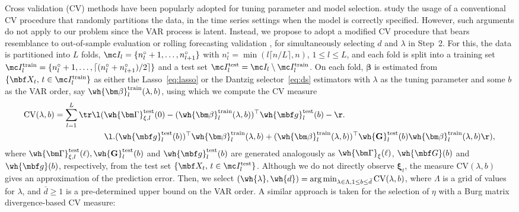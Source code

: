 Cross validation (CV) methods have been popularly adopted for tuning parameter and model selection.
\cite{bergmeir2018note} study the usage of a conventional CV procedure that randomly partitions the data, in the time series settings when the model is correctly specified.
However, such arguments do not apply to our problem since the VAR process is latent. 
Instead, we propose to adopt a modified CV procedure that bears resemblance to out-of-sample evaluation or rolling forecasting validation \citep{wang2021rate}, for simultaneously selecting $d$ and $\lambda$ in Step~2.
For this, the data is partitioned into $L$ folds, $\mc I_l = \{n^\circ_l + 1, \ldots, n^\circ_{l + 1}\}$ with $n^\circ_l = \min(l \lceil n/L \rceil, n), \, 1 \le l \le L$, and each fold is split into a training set $\mc I^{\text{train}}_l = \{n^\circ_l + 1, \ldots, \lceil (n^\circ_l + n^\circ_{l + 1})/2 \rceil\}$ and a test set $\mc I^{\text{test}}_l = \mc I_l \setminus \mc I^{\text{train}}_l$.
On each fold, $\bm\beta$ is estimated from $\{\mbf X_t, \, t \in \mc I^{\text{train}}_l\}$ as either the Lasso~\eqref{eq:lasso} or the Dantzig selector~\eqref{eq:ds} estimators with $\lambda$ as the tuning parameter and some $b$ as the VAR order, say $\wh{\bm\beta}^{\text{train}}_l(\lambda, b)$, using which we compute the CV measure
\begin{align*}
\text{CV}(\lambda, b) &= \sum_{l = 1}^L \tr\l( \wh{\bm\Gamma}^{\text{test}}_{\xi, l}(0) - (\wh{\bm\beta}_l^{\text{train}}(\lambda, b))^\top \wh{\mbf g}_l^{\text{test}}(b) -  
\r. \\  & \qquad \qquad \qquad \l. 
(\wh{\mbf g}_l^{\text{test}}(b))^\top \wh{\bm\beta}_l^{\text{train}}(\lambda, b)
+  (\wh{\bm\beta}_l^{\text{train}}(\lambda, b))^\top \wh{\mathbf G}_l^{\text{test}}(b)
\wh{\bm\beta}_l^{\text{train}}(\lambda, b) \r),
\end{align*}
where $\wh{\bm\Gamma}_{\xi, l}^{\text{test}}(\ell), \wh{\mathbf G}_l^{\text{test}}(b)$ and $\wh{\mbf g}_l^{\text{test}}(b)$ are generated analogously as $\wh{\bm\Gamma}_\xi(\ell)$, $\wh{\mbf G}(b)$ and $\wh{\mbf g}(b)$, respectively, from the test set $\{\mbf X_t, \, t \in \mc I^{\text{test}}_l\}$.
Although we do not directly observe $\bm\xi_t$, the measure $\text{CV}(\lambda, b)$ gives an approximation of the prediction error.
Then, we select $(\wh{\lambda}, \wh{d}) = \arg\min_{\lambda \in \Lambda, 1 \le b \le \bar{d}} \text{CV} (\lambda, b)$, where $\Lambda$ is a grid of values for $\lambda$, and $\bar{d} \ge 1$ is a pre-determined upper bound on the VAR order.
A similar approach is taken for the selection of $\eta$ with a Burg matrix divergence-based CV measure:
